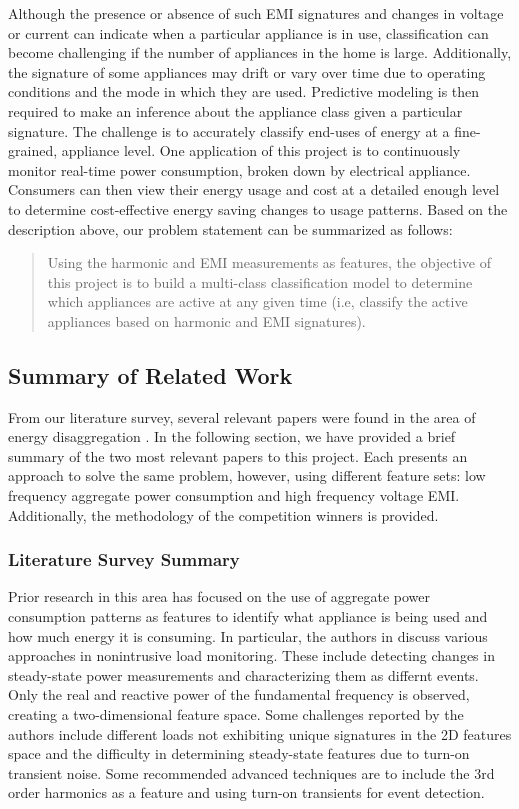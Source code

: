 \documentclass[11pt, letterpaper]{article}
\begin{document}
Although the presence or absence of such EMI signatures and changes in voltage or current can indicate when a particular appliance is in use, classification can become challenging if the number of appliances in the home is large. Additionally, the signature of some appliances may drift or vary over time due to operating conditions and the mode in which they are used.  Predictive modeling is then required to make an inference about the appliance class given a particular signature.  The challenge is to accurately classify end-uses of energy at a fine-grained, appliance level. One application of this project is to continuously monitor real-time power consumption, broken down by electrical appliance.  Consumers can then view their energy usage and cost at a detailed enough level to determine cost-effective energy saving changes to usage patterns.  Based on the description above, our problem statement can be summarized as follows:

\begin{quote}
Using the harmonic and EMI measurements as features, the objective of this project is to build a multi-class classification model to determine which appliances are active at any given time (i.e, classify the active appliances based on harmonic and EMI signatures). 
\end{quote}



\subsection{Summary of Related Work}

From our literature survey, several relevant papers were found in the area of energy disaggregation \cite{EMI,emisurvey,mit,adaptive,prob}.  In the following section, we have provided a brief summary of the two most relevant papers to this project.  Each presents an approach to solve the same problem, however, using different feature sets: low frequency aggregate power consumption and high frequency voltage EMI. Additionally, the methodology of the competition winners is provided.

\subsubsection{Literature Survey Summary}

Prior research in this area has focused on the use of aggregate power consumption patterns as features to identify what appliance is being used and how much energy it is consuming. In particular, the authors in \cite{mit} discuss various approaches in nonintrusive load monitoring.  These include detecting changes in steady-state power measurements and characterizing them as differnt events.  Only the real and reactive power of the fundamental frequency is observed, creating a two-dimensional feature space.  Some challenges reported by the authors include different loads not exhibiting unique signatures in the 2D features space and the difficulty in determining steady-state features due to turn-on transient noise.  Some recommended advanced techniques are to include the 3rd order harmonics as a feature and using turn-on transients for event detection.  
\end{document}
